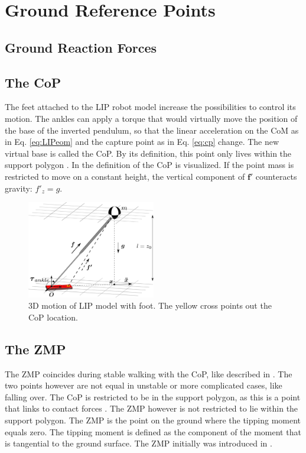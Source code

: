 \section{Ground Reference Points}

\subsection{Ground Reaction Forces}

\subsection{The \ac{CoP}}
The feet attached to the \ac{LIP} robot model increase the possibilities to control its motion. The ankles can apply a torque that would virtually move the position of the base of the inverted pendulum, so that the linear acceleration on the \ac{CoM} as in Eq. \eqref{eq:LIPeom} and the capture point as in Eq. \eqref{eq:cp} change. The new virtual base is called the \ac{CoP}. By its definition, this point only lives within the support polygon \cite{vukobratovic2004zero}. In  the definition of the \ac{CoP} is visualized. If the point mass is restricted to move on a constant height, the vertical component of $\boldsymbol{f'}$ counteracts gravity: $f'_z=g$. 
\begin{figure}[h]
\centering
\includegraphics[width=0.5\textwidth]{STYLESTUFF/3DCoMwithfoot.png}
\caption{\ac{3D} motion of \ac{LIP} model with foot. The yellow cross points out the \ac{CoP} location.}
\label{fig:3dlipfoot}
\end{figure}
\subsection{The \ac{ZMP}}
The \ac{ZMP} coincides during stable walking with the \ac{CoP}, like described in \cite{vukobratovic2004zero}. The two points however are not equal in unstable or more complicated cases, like falling over.  The \ac{CoP} is restricted to be in the support polygon, as this is a point that links to contact forces \cite{sardain2004forces}. The \ac{ZMP} however is not restricted to lie within the support polygon. The \ac{ZMP} is the point on the ground where the tipping moment equals zero. The tipping moment is defined as the component of the moment that is tangential to the ground surface. The \ac{ZMP} initially was introduced in \cite{vukobratovic1969contribution}.


